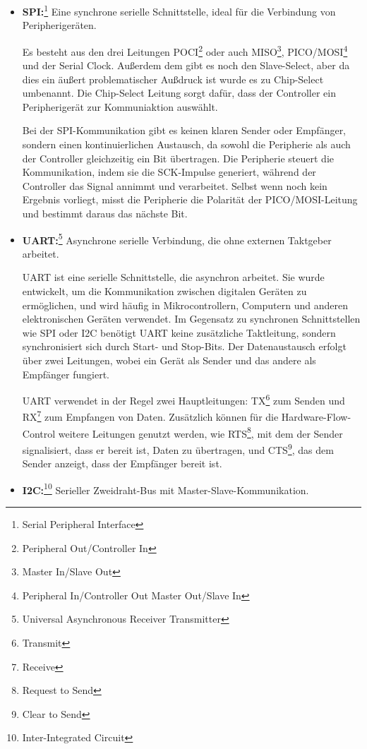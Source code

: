 \documentclass[
    headings=optiontotocandhead,%
    twoside,
    numbers=noenddot,%
    12pt, %
    titlepage, %
    parskip=full, %
    listof=leveldown, 
    numbers=noenddot, %
    a4paper,DIV=14,
    BCOR=15mm,
]{scrbook}
\begin{document}
\begin{itemize}
\item
  \textbf{SPI:}\footnote{Serial Peripheral Interface} Eine synchrone
  serielle Schnittstelle, ideal für die Verbindung von Peripherigeräten.

  Es besteht aus den drei Leitungen POCI\footnote{Peripheral
    Out/Controller In} oder auch MISO\footnote{Master In/Slave Out},
  PICO/MOSI\footnote{Peripheral In/Controller Out \textbar{} Master
    Out/Slave In} und der Serial Clock. Außerdem dem gibt es noch den
  Slave-Select, aber da dies ein äußert problematischer Außdruck ist
  wurde es zu Chip-Select umbenannt. Die Chip-Select Leitung sorgt
  dafür, dass der Controller ein Peripherigerät zur Kommuniaktion
  auswählt.

  Bei der SPI-Kommunikation gibt es keinen klaren Sender oder Empfänger,
  sondern einen kontinuierlichen Austausch, da sowohl die Peripherie als
  auch der Controller gleichzeitig ein Bit übertragen. Die Peripherie
  steuert die Kommunikation, indem sie die SCK-Impulse generiert,
  während der Controller das Signal annimmt und verarbeitet. Selbst wenn
  noch kein Ergebnis vorliegt, misst die Peripherie die Polarität der
  PICO/MOSI-Leitung und bestimmt daraus das nächste Bit.
\item
  \textbf{UART:}\footnote{Universal Asynchronous Receiver Transmitter}
  Asynchrone serielle Verbindung, die ohne externen Taktgeber arbeitet.

  UART ist eine serielle Schnittstelle, die asynchron arbeitet. Sie
  wurde entwickelt, um die Kommunikation zwischen digitalen Geräten zu
  ermöglichen, und wird häufig in Mikrocontrollern, Computern und
  anderen elektronischen Geräten verwendet. Im Gegensatz zu synchronen
  Schnittstellen wie SPI oder I2C benötigt UART keine zusätzliche
  Taktleitung, sondern synchronisiert sich durch Start- und Stop-Bits.
  Der Datenaustausch erfolgt über zwei Leitungen, wobei ein Gerät als
  Sender und das andere als Empfänger fungiert.

  UART verwendet in der Regel zwei Hauptleitungen: TX\footnote{Transmit}
  zum Senden und RX\footnote{Receive} zum Empfangen von Daten.
  Zusätzlich können für die Hardware-Flow-Control weitere Leitungen
  genutzt werden, wie RTS\footnote{Request to Send}, mit dem der Sender
  signalisiert, dass er bereit ist, Daten zu übertragen, und
  CTS\footnote{Clear to Send}, das dem Sender anzeigt, dass der
  Empfänger bereit ist.
\item
  \textbf{I2C:}\footnote{Inter-Integrated Circuit} Serieller
  Zweidraht-Bus mit Master-Slave-Kommunikation.


\end{itemize}
\end{document}
